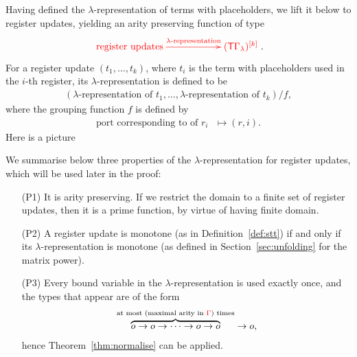 Having defined the $\lambda$-representation of terms with placeholders, we lift it below to  register updates, yielding an  arity preserving function of type
\begin{align}\label{eq:lambda-representation-regup}
\ranked{
    \xymatrix@C=2cm{
 \text{register updates}    \ar[r]^-{\text{$\lambda$-representation}} &
 \mati k {(\tmonad\Gamma_\lambda)}
}
}.
\end{align}
For a register update $(t_1,\ldots,t_k)$, where $t_i$ is the term with placeholders used in the $i$-th register,  its $\lambda$-representation is defined to be 
\begin{align*}
(\text{$\lambda$-representation of $t_1$},\ldots,\text{$\lambda$-representation of $t_k$})/f ,
\end{align*}
 where the grouping function $f$ is defined by
 \begin{align*}
 \text{port corresponding to  of $r_i$ } \mapsto (r,i).
 \end{align*}
Here is a picture


We  summarise below three properties of the $\lambda$-representation for register updates, which will be used later in the proof:
\begin{enumerate}
\item[(P1)] It is  arity preserving. If we restrict the domain to a finite set of register updates, then it is a prime function, by virtue of having finite domain.
\item[(P2)] A register update is monotone  (as in Definition~\ref{def:stt})  if and only if its $\lambda$-representation is monotone (as defined in    Section~\ref{sec:unfolding} for the matrix power).
\item[(P3)] Every bound variable in the $\lambda$-representation is used exactly once, and the types that appear are of the form 
\begin{align*}
\overbrace{o \to o \to \cdots \to o \to o}^{\text{at most (maximal arity in ${\color{red}{\Gamma}}$) times}} \to o,
\end{align*}
hence Theorem~\ref{thm:normalise} can be applied. 
\end{enumerate}

